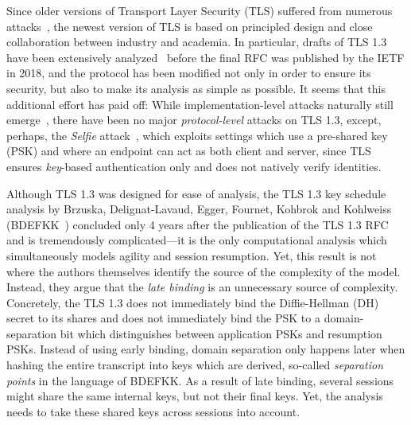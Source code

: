 Since older versions of Transport Layer Security (TLS) suffered from numerous attacks~\cite{SP:BBDFKP15,CCS:ABDGGH15,USENIX:BocSomYou18,SP:AlFPat13,USENIX:ASSHDS16,SP:BBFGKZ16,CCS:MVVP12,SP:BDFPS14,NDSS:BhaLeu16}, %
the newest version of TLS is based on principled design and close collaboration between industry and academia.
In particular, drafts of TLS 1.3 have been extensively analyzed~\cite{CCS:DFGS15,EPRINT:DFGS16,SP:LXZFH16,SP:CHSM16,CCS:CHHSM17} %
before the final RFC was published by the IETF in 2018, and the protocol has been modified not only in order to ensure
its security, but also to make its analysis as simple as possible. It seems that this additional effort has paid off: While implementation-level attacks naturally still emerge~\cite{X}, there have been no major \emph{protocol-level} attacks on TLS 1.3, except, perhaps, the \emph{Selfie} attack~\cite{JC:DruGue21}, which exploits settings which use a pre-shared key (PSK) and where an endpoint can act as both client and server, since TLS ensures \emph{key}-based authentication only and does not natively verify identities. %

Although TLS 1.3 was designed for ease of analysis, the TLS 1.3 key schedule analysis by Brzuska, Delignat-Lavaud, Egger, Fournet, Kohbrok and Kohlweiss (BDEFKK~\cite{AC:BDEFKK22}) concluded only 4 years after the publication of the TLS 1.3 RFC and is tremendously complicated---it is the only computational analysis which simultaneously models agility and session resumption. Yet, this result is not where the authors themselves identify the source of the complexity of the model. Instead, they argue that the \emph{late binding} is an unnecessary source of complexity. Concretely, the TLS 1.3 does not immediately bind the Diffie-Hellman (DH) secret to its shares and does not immediately bind the PSK to a domain-separation bit which distinguishes between application PSKs and resumption PSKs. Instead of using early binding, domain separation only happens later when hashing the entire transcript into keys which are derived, so-called \emph{separation points} in the language of BDEFKK. As a result of late binding, several sessions might share the same internal keys, but not their final keys. Yet, the analysis needs to take these shared keys across sessions into account.

